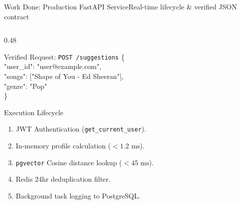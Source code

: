 \documentclass[aspectratio=169,10pt]{beamer}
\begin{document}
\begin{frame}[fragile]{Work Done: Production FastAPI Service}{Real-time lifecycle \& verified JSON contract}
    \begin{columns}[T]
        \begin{column}{0.48\textwidth}
            \begin{block}{Verified Request: \texttt{POST /suggestions}}
                \fontsize{6pt}{7.5pt}\selectfont\ttfamily
                \{\\
                \quad "user\_id": "user@example.com",\\
                \quad "songs": ["Shape of You - Ed Sheeran"],\\
                \quad "genre": "Pop"\\
                \}
            \end{block}

            \begin{block}{Execution Lifecycle}
                \begin{enumerate}\fontsize{6pt}{8pt}\selectfont
                    \item JWT Authentication (\texttt{get\_current\_user}).
                    \item In-memory profile calculation ($<1.2\text{ ms}$).
                    \item \texttt{pgvector} Cosine distance lookup ($<45\text{ ms}$).
                    \item Redis 24hr deduplication filter.
                    \item Background task logging to PostgreSQL.
                \end{enumerate}
            \end{block}
        \end{column}


\end{columns}
\end{frame}
\end{document}

